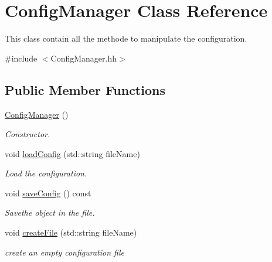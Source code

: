 \hypertarget{classConfigManager}{}\section{Config\+Manager Class Reference}
\label{classConfigManager}


This class contain all the methode to manipulate the configuration.  




{\ttfamily \#include $<$Config\+Manager.\+hh$>$}

\subsection*{Public Member Functions}
\begin{DoxyCompactItemize}
\item 
\mbox{\label{classConfigManager_a7d3d7c10423d969f7544509f6fcca32f}} 
\hyperlink{classConfigManager_a7d3d7c10423d969f7544509f6fcca32f}{Config\+Manager} ()
\begin{DoxyCompactList}\small\item\em Constructor. \end{DoxyCompactList}\item 
void \hyperlink{classConfigManager_aabe7403d71337e1984dff31f450c413b}{load\+Config} (std\+::string file\+Name)
\begin{DoxyCompactList}\small\item\em Load the configuration. \end{DoxyCompactList}\item 
\mbox{\label{classConfigManager_a178e051860792271e9b1ec4434776f91}} 
void \hyperlink{classConfigManager_a178e051860792271e9b1ec4434776f91}{save\+Config} () const
\begin{DoxyCompactList}\small\item\em Savethe object in the file. \end{DoxyCompactList}\item 
void \hyperlink{classConfigManager_af78f80706b5a300a738c3fde04c9c91b}{create\+File} (std\+::string file\+Name)
\begin{DoxyCompactList}\small\item\em create an empty configuration file \end{DoxyCompactList}\end{DoxyCompactItemize}
